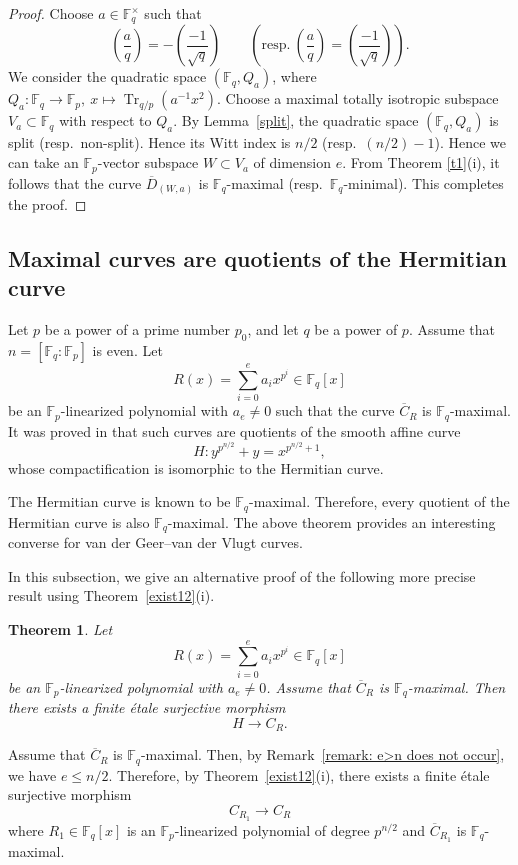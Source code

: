 \documentclass[12pt,a4paper]{amsart}
\newtheorem{theorem}{Theorem}[section]
\theoremstyle{definition}
\def\F{{\mathbb F}}
\theoremstyle{remark}
\DeclareMathOperator{\Tr}{Tr}
\begin{document}
\begin{proof}
Choose $a \in \F_q^{\times}$ such that 
\[
\left(\frac{a}{q}\right)=-\left(\frac{-1}{\sqrt{q}}\right)
 \qquad (\textrm{resp.}\ \left(\frac{a}{q}\right)=\left(\frac{-1}{\sqrt{q}}\right)).
\]
We consider the quadratic space $(\F_q,Q_a)$, 
where $Q_a \colon \F_q \to \F_p,\ x \mapsto \Tr_{q/p}(a^{-1} x^2)$. 
Choose a maximal totally isotropic subspace $V_a \subset \F_q$
with respect to $Q_a$. 
By Lemma~\ref{split}, the quadratic space
$(\F_q,Q_a)$ is split (resp.\ non-split).
Hence its Witt index is
$n/2$ (resp.\ $(n/2)-1$). 
Hence we can take an $\F_p$-vector subspace $W \subset V_a$ of dimension $e$. 
From Theorem \ref{t1}(i), 
it follows that the curve $\overline{D}_{(W,a)}$ is 
$\F_q$-maximal (resp.\ $\F_q$-minimal). This completes the proof. 
\end{proof}

\subsection{Maximal curves are quotients of the Hermitian curve}\label{appB}
Let $p$ be a power of a prime number $p_0$, and let $q$ be a power of $p$. Assume that $n=[\F_q:\F_p]$ is even. Let 
\[
R(x)=\sum_{i=0}^ea_ix^{p^i}\in \F_q[x]
\]
be an $\F_p$-linearized polynomial with $a_e\neq0$ such that the curve $\overline{C}_R$ is $\F_q$-maximal. 
It was proved in \cite[Theorem 6.12]{CO0} that such curves are quotients of the smooth affine curve 
\[
H\colon y^{p^{n/2}}+y=x^{p^{n/2}+1}, 
\]
whose compactification is isomorphic to the Hermitian curve. 

The Hermitian curve is known to be $\F_q$-maximal. Therefore, every quotient of the Hermitian curve is also $\F_q$-maximal. The above theorem \cite[Theorem 6.12]{CO0} provides an interesting converse for van der Geer--van der Vlugt curves. 


In this subsection, we give an alternative proof of the following more precise result using Theorem~\ref{exist12}(i). 
\begin{theorem}\label{theorem: quotient of Hermitian curve}
Let 
\[
R(x)=\sum_{i=0}^ea_ix^{p^i}\in \F_q[x]
\]
be an $\F_p$-linearized polynomial with $a_e\neq0$. Assume that $\overline{C}_R$ is $\F_q$-maximal. Then there exists a finite \'etale surjective morphism 
\[
H\to C_R. 
\] 
\end{theorem}

Assume that $\overline{C}_R$ is $\F_q$-maximal.  Then, by Remark~\ref{remark: e>n does not occur}, we have $e\le n/2$. Therefore, by Theorem~\ref{exist12}(i), there exists a finite \'etale surjective morphism 
\[
C_{R_1}\to C_R
\]
where $R_1\in \F_q[x]$ is an $\F_p$-linearized polynomial of degree $p^{n/2}$ and $\overline{C}_{R_1}$ is $\F_q$-maximal. 
\end{document}
